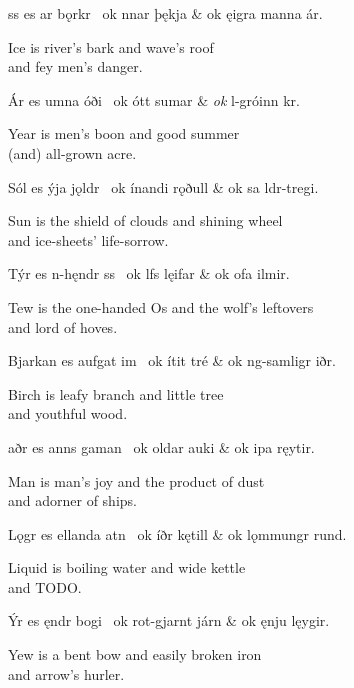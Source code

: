 \bvg\bva {}ss es ar bǫrkr \hld\ ok nnar þękja &
\ind ok ęigra manna ár.\eva

\bvb Ice is river’s bark and wave’s roof \\
\ind and fey men’s danger.\evb\evg


\bvg\bva Ár es umna óði \hld\ ok ótt sumar &
\ind \emph{ok} l-gróinn kr.\eva

\bvb Year is men’s boon and good summer \\
\ind (and) all-grown acre.\evb\evg


\bvg\bva Sól es ýja jǫldr \hld\ ok ínandi rǫðull &
\ind ok sa ldr-tregi.\eva

\bvb Sun is the shield of clouds and shining wheel \\
\ind and ice-sheets’ life-sorrow.\evb\evg


\bvg\bva Týr es n-hęndr ss \hld\ ok lfs lęifar &
\ind ok ofa ilmir.\eva

\bvb Tew is the one-handed Os and the wolf’s leftovers \\
\ind and lord of hoves.\evb\evg


\bvg\bva Bjarkan es aufgat im \hld\ ok ítit tré &
\ind ok ng-samligr iðr.\eva

\bvb Birch is leafy branch and little tree \\
\ind and youthful wood.\evb\evg


\bvg\bva {}aðr es anns gaman \hld\ ok oldar auki &
\ind ok ipa ręytir.\eva

\bvb Man is man’s joy and the product of dust \\
\ind and adorner of ships.\evb\evg


\bvg\bva Lǫgr es ellanda atn \hld\ ok íðr kętill &
\ind ok lǫmmungr rund.\eva

\bvb Liquid is boiling water and wide kettle \\
\ind and TODO.\evb\evg


\bvg\bva Ýr es ęndr bogi \hld\ ok rot-gjarnt járn &
\ind ok ęnju lęygir.\eva

\bvb Yew is a bent bow and easily broken iron \\
\ind and arrow’s hurler.\evb\evg

\sectionline


